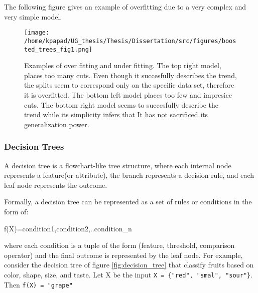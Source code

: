 \begin{itemize}
The following figure gives an example of overfitting due to a very complex and very simple model.
\begin{figure}[h]
\centering
\texttt{[image: /home/kpapad/UG\_thesis/Thesis/Dissertation/src/figures/boosted\_trees\_fig1.png]}
\caption{Examples of over fitting and under fitting. The top right model, places too many cuts. Even though it succesfully describes the trend, the splits seem to correspond only on the specific data set, therefore it is overfitted. The bottom left model places too few and impresice cuts. The bottom right model seems to succesfully describe the trend while its simplicity infers that It has not sacrificed its generalization power. }
\label{fig:ovft}
\end{figure}
\end{itemize}

\subsubsection{Decision Trees}
\label{sec:org266e57e}
A decision tree is a flowchart-like tree structure, where each internal node represents a feature(or attribute), the branch represents a decision rule, and each leaf node represents the outcome.

Formally, a decision tree can be represented as a set of rules or conditions in the form of:
\begin{center}
\begin{verbatim*}
f(X)={condition1,condition2,..condition_n}
\end{verbatim*}
\end{center}
where each condition is a tuple of the form (feature, threshold, comparison operator) and the final outcome is represented by the leaf node. For example, consider the decision tree of  figure \ref{fig:decision_tree} that classify fruits based on color, shape, size, and taste. Let X be the input \texttt{X = \{"red", "smal", "sour"\}}. Then \texttt{f(X) = "grape"}  \cite{PatternClassification}

